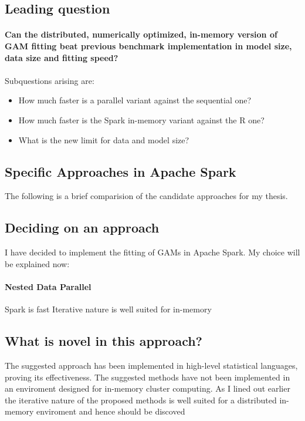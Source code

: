 \documentclass{article}
\begin{document}
    \subsection{Leading question}

    \paragraph{Can the distributed, numerically optimized, in-memory version of GAM fitting beat previous benchmark implementation in model size, data size and fitting speed?}

    \paragraph{}
    Subquestions arising are:
        \begin{itemize}
        \item How much faster is a parallel variant against the sequential one?
        \item How much faster is the Spark in-memory variant against the R one?
        \item What is the new limit for data and model size?
        \end{itemize}

    \subsection{Specific Approaches in Apache Spark}
    The following is a brief comparision of the candidate approaches for my thesis.




    \subsection{Deciding on an approach}

    I have decided to implement the fitting of GAMs in Apache Spark. My choice will be explained now:
    \paragraph{Nested Data Parallel}
        Spark is fast
        Iterative nature is well suited for in-memory



    \subsection{What is novel in this approach?}
    The suggested approach has been implemented in high-level statistical languages, proving its effectiveness. The suggested methods have not been implemented in an enviroment designed for in-memory cluster computing. As I lined out earlier the iterative nature of the proposed methods is well suited for a distributed in-memory enviroment and hence should be discoved
\end{document}
